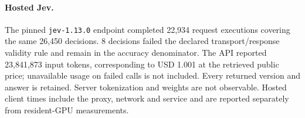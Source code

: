 \paragraph{Hosted Jev.} The pinned \texttt{jev-1.13.0} endpoint completed 22,934 request executions covering the same 26,450 decisions. 8 decisions failed the declared transport/response validity rule and remain in the accuracy denominator. The API reported 23,841,873 input tokens, corresponding to USD 1.001 at the retrieved public price; unavailable usage on failed calls is not included. Every returned version and answer is retained. Server tokenization and weights are not observable. Hosted client times include the proxy, network and service and are reported separately from resident-GPU measurements.
